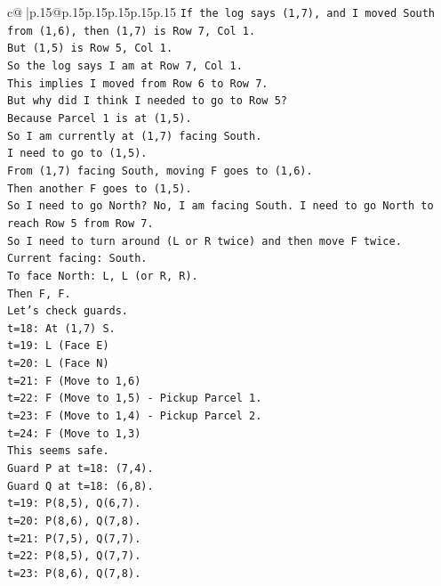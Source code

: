 \documentclass{article}
\begin{document}
{\begin{supertabular}{c@{$\;$}|p{.15\linewidth}@{}p{.15\linewidth}p{.15\linewidth}p{.15\linewidth}p{.15\linewidth}p{.15\linewidth}}
{{{\texttt{If the log says (1,7), and I moved South from (1,6), then (1,7) is Row 7, Col 1.} \\
\texttt{But (1,5) is Row 5, Col 1.} \\
\texttt{So the log says I am at Row 7, Col 1.} \\
\texttt{This implies I moved from Row 6 to Row 7.} \\
\texttt{But why did I think I needed to go to Row 5?} \\
\texttt{Because Parcel 1 is at (1,5).} \\
\texttt{So I am currently at (1,7) facing South.} \\
\texttt{I need to go to (1,5).} \\
\texttt{From (1,7) facing South, moving F goes to (1,6).} \\
\texttt{Then another F goes to (1,5).} \\
\texttt{So I need to go North? No, I am facing South. I need to go North to reach Row 5 from Row 7.} \\
\texttt{So I need to turn around (L or R twice) and then move F twice.} \\
\texttt{Current facing: South.} \\
\texttt{To face North: L, L (or R, R).} \\
\texttt{Then F, F.} \\
\texttt{Let's check guards.} \\
\texttt{t=18: At (1,7) S.} \\
\texttt{t=19: L (Face E)} \\
\texttt{t=20: L (Face N)} \\
\texttt{t=21: F (Move to 1,6)} \\
\texttt{t=22: F (Move to 1,5) {-} Pickup Parcel 1.} \\
\texttt{t=23: F (Move to 1,4) {-} Pickup Parcel 2.} \\
\texttt{t=24: F (Move to 1,3)} \\
\texttt{This seems safe.} \\
\texttt{Guard P at t=18: (7,4).} \\
\texttt{Guard Q at t=18: (6,8).} \\
\texttt{t=19: P(8,5), Q(6,7).} \\
\texttt{t=20: P(8,6), Q(7,8).} \\
\texttt{t=21: P(7,5), Q(7,7).} \\
\texttt{t=22: P(8,5), Q(7,7).} \\
\texttt{t=23: P(8,6), Q(7,8).} \\
}}}
\end{supertabular}}
\end{document}
